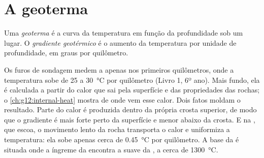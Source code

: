 \section{A geoterma}

\begin{definition}\label{def:g11:lithosphere-asthenosphere:geotherm}
Uma \emph{geoterma} é a curva da temperatura em função da
profundidade sob um lugar. O \emph{gradiente geotérmico}
é o aumento da temperatura por unidade de profundidade, em graus por
quilômetro.
\end{definition}

Os furos de sondagem medem a  apenas nos primeiros quilômetros, onde
a temperatura sobe de 25 a \qty{30}{\celsius} por quilômetro (Livro 1,
6º ano). Mais fundo, ela é calculada a partir do calor que sai pela
superfície e das propriedades das rochas; o \cref{ch:g12:internal-heat}
mostra de onde vem esse calor. Dois fatos moldam o resultado. Parte do calor
é produzida dentro da própria crosta superior, de modo que o gradiente é
mais forte perto da superfície e menor abaixo da crosta. E na ,
que escoa, o movimento lento da rocha transporta o calor e uniformiza a
temperatura: ela sobe apenas cerca de \qty{0.45}{\celsius} por quilômetro.
A base da  é situada onde a  íngreme da  encontra
a  suave da , a cerca de \qty{1300}{\celsius}.

